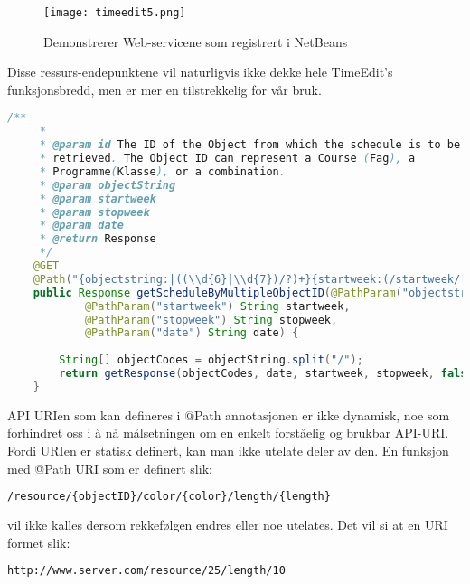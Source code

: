 \documentclass[../main.tex]{subfiles}
\begin{document}
\begin{figure}[H]
  \centering
  \texttt{[image: timeedit5.png]}
\caption{Demonstrerer Web-servicene som registrert i NetBeans}
\end{figure}

Disse ressurs-endepunktene vil naturligvis ikke dekke hele TimeEdit’s funksjonsbredd, men er mer en tilstrekkelig for vår bruk.

\begin{lstlisting}[language=Java, frame=single, caption={Utdrag fra klassen TimeEditService som viser en JAX-RS annotert funksjon.}]
  /**
     *
     * @param id The ID of the Object from which the schedule is to be
     * retrieved. The Object ID can represent a Course (Fag), a
     * Programme(Klasse), or a combination.
     * @param objectString
     * @param startweek
     * @param stopweek
     * @param date
     * @return Response
     */
    @GET
    @Path("{objectstring:|((\\d{6}|\\d{7})/?)+}{startweek:(/startweek/[^/]+?)?}{stopweek:(/stopweek/[^/]+?)?}{date:(/date/[^/]+?)?}")
    public Response getScheduleByMultipleObjectID(@PathParam("objectstring") String objectString,
            @PathParam("startweek") String startweek,
            @PathParam("stopweek") String stopweek,
            @PathParam("date") String date) {
       
        String[] objectCodes = objectString.split("/");        
        return getResponse(objectCodes, date, startweek, stopweek, false);
    }
\end{lstlisting}

API URIen som kan defineres i @Path annotasjonen er ikke dynamisk, noe som forhindret oss i å nå målsetningen om en enkelt forståelig og brukbar API-URI. Fordi URIen er statisk definert, kan man ikke utelate deler av den. En funksjon med @Path URI som er definert slik:

\begin{lstlisting}[language=HTML, frame=single, caption={Eksempel på en statisk definert URI}]
/resource/{objectID}/color/{color}/length/{length}
\end{lstlisting}

vil ikke kalles dersom rekkefølgen endres eller noe utelates. Det vil si at en URI formet slik:

\begin{lstlisting}[language=HTML, frame=single, caption={Eksempel på en URI}]
http://www.server.com/resource/25/length/10
\end{lstlisting}
\end{document}
